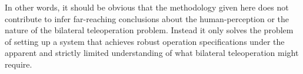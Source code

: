 In other words, it should be obvious that the methodology given here does not contribute to infer far-reaching conclusions about the 
human-perception or the nature of the bilateral teleoperation problem. Instead it only solves the problem of setting up a system that 
achieves robust operation specifications under the apparent and strictly limited understanding of what bilateral teleoperation might require. 
